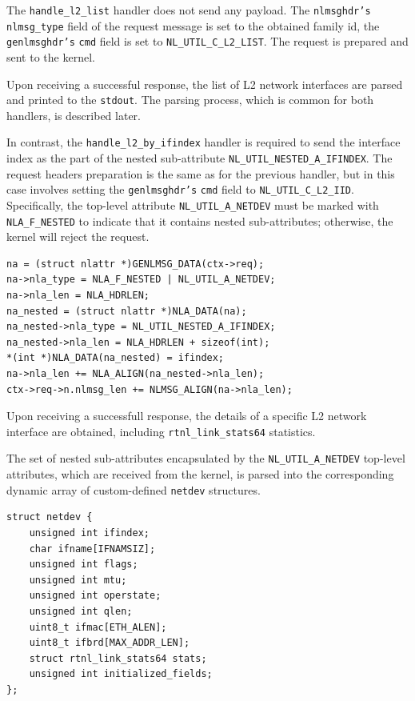 \documentclass[10pt, letterpaper]{article}
\begin{document}
The \texttt{handle\_l2\_list} handler does not send any payload. The \texttt{nlmsghdr's}
\texttt{nlmsg\_type} field of the request message is set to the obtained family id, the
\texttt{genlmsghdr's} \texttt{cmd} field is set to \texttt{NL\_UTIL\_C\_L2\_LIST}. The
request is prepared and sent to the kernel.

Upon receiving a successful response, the list of L2 network interfaces are parsed and printed
to the \texttt{stdout}. The parsing process, which is common for both handlers, is
described later.

In contrast, the \texttt{handle\_l2\_by\_ifindex} handler is required to send the
interface index as the part of the nested sub-attribute \texttt{NL\_UTIL\_NESTED\_A\_IFINDEX}.
The request headers preparation is the same as for the previous handler, but in this case
involves setting the \texttt{genlmsghdr's} \texttt{cmd} field to
\texttt{NL\_UTIL\_C\_L2\_IID}. Specifically, the top-level attribute
\texttt{NL\_UTIL\_A\_NETDEV} must be marked with \texttt{NLA\_F\_NESTED} to indicate that
it contains nested sub-attributes; otherwise, the kernel will reject the request.

\begin{lstlisting}[caption={Request payload with the interface index}]
na = (struct nlattr *)GENLMSG_DATA(ctx->req);
na->nla_type = NLA_F_NESTED | NL_UTIL_A_NETDEV;
na->nla_len = NLA_HDRLEN;
na_nested = (struct nlattr *)NLA_DATA(na);
na_nested->nla_type = NL_UTIL_NESTED_A_IFINDEX;
na_nested->nla_len = NLA_HDRLEN + sizeof(int);
*(int *)NLA_DATA(na_nested) = ifindex;
na->nla_len += NLA_ALIGN(na_nested->nla_len);
ctx->req->n.nlmsg_len += NLMSG_ALIGN(na->nla_len);
\end{lstlisting}

Upon receiving a successfull response, the details of a specific L2 network interface are
obtained, including \texttt{rtnl\_link\_stats64} statistics.

The set of nested sub-attributes encapsulated by the \texttt{NL\_UTIL\_A\_NETDEV} top-level
attributes, which are received from the kernel, is parsed into the corresponding dynamic array of
custom-defined \texttt{netdev} structures.
\begin{lstlisting}[caption={User space netdev structure}]
 struct netdev {
    unsigned int ifindex;
    char ifname[IFNAMSIZ];
    unsigned int flags;
    unsigned int mtu;
    unsigned int operstate;
    unsigned int qlen;
    uint8_t ifmac[ETH_ALEN];
    uint8_t ifbrd[MAX_ADDR_LEN];
    struct rtnl_link_stats64 stats;
    unsigned int initialized_fields;
};
\end{lstlisting}
\end{document}
